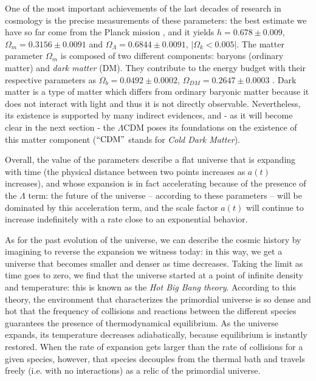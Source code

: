  One of the most important achievements of the last decades of research in cosmology is the precise measurements of these parameters: the best estimate we have so far come from the Planck mission \citep{2016planck}, and it yields $h = 0.678\pm 0.009$, $\Omega_m = 0.3156 \pm 0.0091$ and $\Omega_\Lambda =  0.6844 \pm 0.0091$, $|\Omega_k < 0.005|$.
 The matter parameter $\Omega_m$ is composed of two different components: baryons (ordinary matter) and \textit{dark matter} (DM). They contribute to the energy budget with their respective parameters as $\Omega_b = 0.0492 ± 0.0002$, $\Omega_{DM} = 0.2647 \pm 0.0003$ \citep{2016planck}. Dark matter is a type of matter which differs from ordinary baryonic matter because it does not interact with light and thus it is not directly observable. Nevertheless, its existence is supported by many indirect evidences, and - as it will become clear in the next section - the $\Lambda \mathrm{CDM}$ poses its foundations on the existence of this matter component ($``\mathrm{CDM}"$ stands for \textit{Cold Dark Matter}).
 
 Overall, the value of the parameters describe a flat universe that is expanding with time (the physical distance between two points increases as $a(t)$ increases), and whose expansion is in fact accelerating because of the presence of the $\Lambda$ term: the future of the universe -- according to these parameters -- will be dominated by this acceleration term, and the scale factor $a(t)$ will continue to increase indefinitely with a rate close to an exponential behavior.
 
 As for the past evolution of the universe, we can describe the cosmic history by imagining to reverse the expansion we witness today: in this way, we get a universe that becomes smaller and denser as time decreases. Taking the limit as time goes to zero, we find that the universe started at a point of infinite density and temperature: this is known as the \textit{Hot Big Bang theory}. According to this theory, the environment that characterizes the primordial universe is so dense and hot that the frequency of collisions and reactions between the different species guarantees the presence of thermodynamical equilibrium. As the universe expands, its temperature decreases adiabatically, because equilibrium is instantly restored. When the rate of expansion gets larger than the rate of collisions for a given species, however, that species decouples from the thermal bath and travels freely (i.e. with no interactions) as a relic of the primordial universe.  
 
